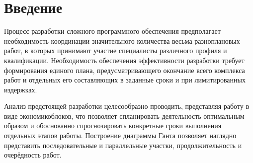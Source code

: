\section{Введение} \label{economics_introduction}

Процесс разработки сложного программного обеспечения предполагает необходимость координации значительного количества весьма разноплановых работ, в которых принимают участие специалисты различного профиля и квалификации. Необходимость обеспечения эффективности разработки требует формирования единого плана, предусматривающего окончание всего комплекса работ и отдельных его составляющих в заданные сроки и при лимитированных издержках.

\vspace{\baselineskip}
Анализ предстоящей разработки целесообразно проводить, представляя работу в виде экономико блоков, что позволяет спланировать деятельность оптимальным образом и обоснованно спрогнозировать конкретные сроки выполнения отдельных этапов работы. Построение диаграммы Ганта позволяет наглядно представить последовательные и параллельные участки, продолжительность и очерёдность работ.